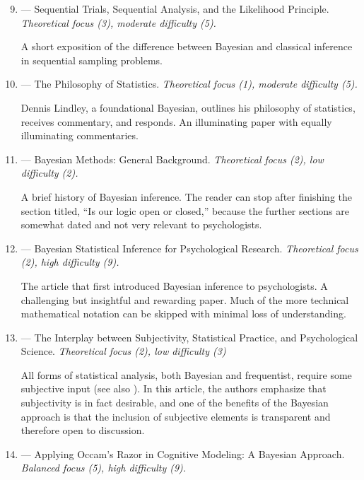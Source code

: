 \begin{enumerate}
  \setcounter{enumi}{8}

\item
\textbf{} --- Sequential Trials, Sequential Analysis, and the Likelihood Principle.  \emph{Theoretical focus (3), moderate difficulty (5).}

A short exposition of the difference between Bayesian and classical inference in sequential sampling problems. 

\item
\textbf{} --- The Philosophy of Statistics.  \emph{Theoretical focus (1), moderate difficulty (5).}

Dennis Lindley, a foundational Bayesian, outlines his philosophy of statistics, receives commentary, and responds. An illuminating paper with equally illuminating commentaries.

\item
\textbf{} --- Bayesian Methods: General Background.  \emph{Theoretical focus (2), low difficulty (2).}

A brief history of Bayesian inference. The reader can stop after finishing the section titled, ``Is our logic open or closed,'' because the further sections are somewhat dated and not very relevant to psychologists.  

\item
\textbf{} --- Bayesian Statistical Inference for Psychological Research.  \emph{Theoretical focus (2), high difficulty (9).}

The article that first introduced Bayesian inference to psychologists. A challenging but insightful and rewarding paper. Much of the more technical mathematical notation can be skipped with minimal loss of understanding.

\item
\textbf{} --- The Interplay between Subjectivity, Statistical Practice, and Psychological Science. \emph{Theoretical focus (2), low difficulty (3)}

All forms of statistical analysis, both Bayesian and frequentist, require some subjective input (see also ).  In this article, the authors emphasize that subjectivity is in fact desirable, and one of the benefits of the Bayesian approach is that the inclusion of subjective elements is transparent and therefore open to discussion.  

\item \textbf{} --- Applying Occam's Razor in Cognitive Modeling: A Bayesian Approach.  \emph{Balanced focus (5), high difficulty (9).}


\end{enumerate}
